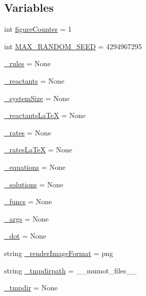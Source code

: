 \subsection*{Variables}
\begin{DoxyCompactItemize}
\item 
int \hyperlink{namespace_mu_mo_t_a4543afee285a2aa1cd5c8c9ca14fe77f}{figure\+Counter} = 1
\item 
int \hyperlink{namespace_mu_mo_t_ae8957aab30c8ae3e6065cd19d166ef22}{M\+A\+X\+\_\+\+R\+A\+N\+D\+O\+M\+\_\+\+S\+E\+ED} = 4294967295
\item 
\hyperlink{namespace_mu_mo_t_a3bffcba47fea374758cdf6e1abc66b6a}{\+\_\+rules} = None
\item 
\hyperlink{namespace_mu_mo_t_ab78b4926218dd610cd20b0fd9816f96b}{\+\_\+reactants} = None
\item 
\hyperlink{namespace_mu_mo_t_afaae7e86425ed04f1e39b4bb8039b1b4}{\+\_\+system\+Size} = None
\item 
\hyperlink{namespace_mu_mo_t_accfd4bbcd94ec3ce4a064fec53921700}{\+\_\+reactants\+La\+TeX} = None
\item 
\hyperlink{namespace_mu_mo_t_a45fe1a3c95be7c7db64a0199619569a9}{\+\_\+rates} = None
\item 
\hyperlink{namespace_mu_mo_t_a795ce014c05817c0ac931270e961020f}{\+\_\+rates\+La\+TeX} = None
\item 
\hyperlink{namespace_mu_mo_t_ab9682b098aac7aac3179a3773749fd71}{\+\_\+equations} = None
\item 
\hyperlink{namespace_mu_mo_t_a31c9407d55747598fa4c9efdd6f9293d}{\+\_\+solutions} = None
\item 
\hyperlink{namespace_mu_mo_t_a8ef9f9e4473f46043da1484716b18268}{\+\_\+funcs} = None
\item 
\hyperlink{namespace_mu_mo_t_a04c0353d4e8a6c3f2e0a1fb36ed9a832}{\+\_\+args} = None
\item 
\hyperlink{namespace_mu_mo_t_aaabcff4440dc0ded9f9f880c9f86c6c1}{\+\_\+dot} = None
\item 
string \hyperlink{namespace_mu_mo_t_a385c519c2aed996e4bad454f870fed0c}{\+\_\+render\+Image\+Format} = \textquotesingle{}png\textquotesingle{}
\item 
string \hyperlink{namespace_mu_mo_t_a4ac4f3325e967c92d03e2c4e023a0d5d}{\+\_\+tmpdirpath} = \textquotesingle{}\+\_\+\+\_\+mumot\+\_\+files\+\_\+\+\_\+\textquotesingle{}
\item 
\hyperlink{namespace_mu_mo_t_ad2feb50403a36ab7c591c04e0cf33cc4}{\+\_\+tmpdir} = None
\item 

\end{DoxyCompactItemize}
